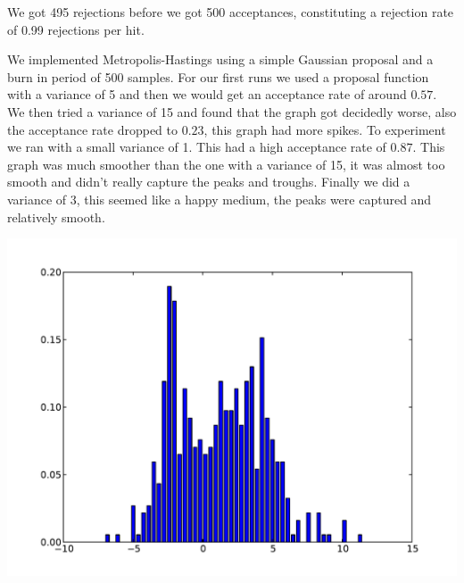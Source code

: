 \documentclass[solution, letterpaper]{cs121}
\begin{document}
\begin{empfile}
We got 495 rejections before we got 500 acceptances, constituting a rejection rate of 0.99 rejections per hit.

\subproblem %

We implemented Metropolis-Hastings using a simple Gaussian proposal and a burn in period of 500 samples. 
For our first runs we used a proposal function with a variance of 5 and then we would get an acceptance rate of around $0.57$. We then tried a variance of 15 and found that the graph got decidedly worse, also the acceptance rate dropped to $0.23$, this graph had more spikes. To experiment we ran with a small variance of 1. This had a high acceptance rate of $0.87$. This graph was much smoother than the one with a variance of 15, it was almost too smooth and didn't really capture the peaks and troughs. Finally we did a variance of 3, this seemed like a happy medium, the peaks were captured and relatively smooth.

\begin{center}
\includegraphics[scale=0.8]{hasty_metro_histogram.pdf}
\end{center}


\end{empfile}

\immediate{}
\end{document}
